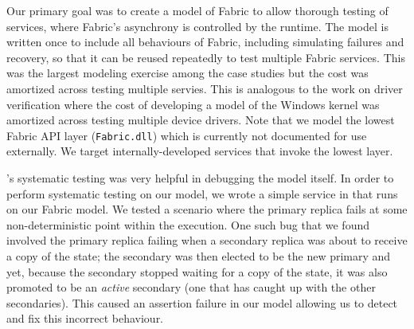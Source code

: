 Our primary goal was to create a \psharp{} model of Fabric to allow
thorough testing of services, where Fabric's asynchrony is controlled 
by the \psharp{} runtime.
The model is written once
to include all behaviours of Fabric, including simulating failures and recovery,
so that it can be reused repeatedly to test multiple Fabric services.
This was the largest modeling exercise among the case studies but the cost
was amortized across testing multiple servies. This is analogous to the work
on driver verification \cite{ball2011slam} where the cost of developing a model
of the Windows kernel was amortized across testing multiple device drivers.
Note that we model the lowest Fabric API layer (\texttt{Fabric.dll})
which is currently not documented for use externally.
We target internally-developed services that invoke the lowest layer. 

\psharp's systematic testing was very helpful in debugging the model itself.
In order to perform systematic testing on our model,
we wrote a simple service in \psharp{}
that runs on our Fabric model.
We tested a scenario where the primary replica
fails at some non-deterministic point
within the execution.
One such bug that we found
involved
the primary replica
failing
when a secondary replica
was about to receive a copy of the state;
the secondary was then elected to be the new primary
and yet, because the secondary stopped waiting for
a copy of the state, it was
also promoted to be an \emph{active} secondary
(one that has caught up with the other secondaries).
This caused an assertion failure in our model
allowing us to detect and fix this incorrect behaviour.



